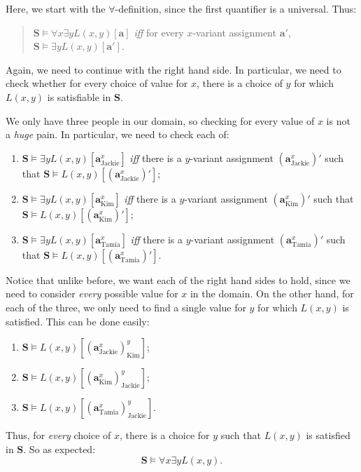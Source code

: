 Here, we start with the $\forall$-definition, since the first quantifier is a universal. Thus:
%
\begin{quote}
	$\mathbf{S} \models \forall x \exists y L(x,y)[\mathbf{a}]$ \textit{iff} for every $x$-variant assignment $\mathbf{a}'$, $\mathbf{S} \models \exists y L(x,y)[\mathbf{a}']$. 
\end{quote}
%
Again, we need to continue with the right hand side. In particular, we need to check whether for every choice of value for $x$, there is a choice of $y$ for which $L(x,y)$ is satisfiable in $\mathbf{S}$.

We only have three people in our domain, so checking for every value of $x$ is not a \textit{huge} pain. In particular, we need to check each of: 

\begin{enumerate}
	\item	$\mathbf{S} \models \exists y L(x,y)[\mathbf{a}^x_\text{Jackie}]$ \textit{iff} there is a $y$-variant assignment $(\mathbf{a}^x_\text{Jackie})'$ such that $\mathbf{S} \models L(x,y)[(\mathbf{a}^x_\text{Jackie})']$;
	\item $\mathbf{S} \models \exists y L(x,y)[\mathbf{a}^x_\text{Kim}]$ \textit{iff} there is a $y$-variant assignment $(\mathbf{a}^x_\text{Kim})'$ such that $\mathbf{S} \models L(x,y)[(\mathbf{a}^x_\text{Kim})']$;
	\item $\mathbf{S} \models \exists y L(x,y)[\mathbf{a}^x_\text{Tamia}]$ \textit{iff} there is a $y$-variant assignment $(\mathbf{a}^x_\text{Tamia})'$ such that $\mathbf{S} \models L(x,y)[(\mathbf{a}^x_\text{Tamia})']$.
\end{enumerate}

Notice that unlike before, we want each of the right hand sides to hold, since we need to consider \textit{every} possible value for $x$ in the domain. On the other hand, for each of the three, we only need to find a single value for $y$ for which $L(x, y)$ is satisfied. This can be done easily: 

\begin{enumerate}
	\item $\mathbf{S} \models L(x,y)[(\mathbf{a}^x_\text{Jackie})^y_\text{Kim}]$;
	\item $\mathbf{S} \models L(x,y)[(\mathbf{a}^x_\text{Kim})^y_\text{Jackie}]$;
	\item $\mathbf{S} \models L(x,y)[(\mathbf{a}^x_\text{Tamia})^y_\text{Jackie}]$.
\end{enumerate}

Thus, for \textit{every} choice of $x$, there is a choice for $y$ such that $L(x, y)$ is satisfied in $\mathbf{S}$. So as expected: 
\[
\mathbf{S} \models \forall x \exists y L(x, y).
\]

